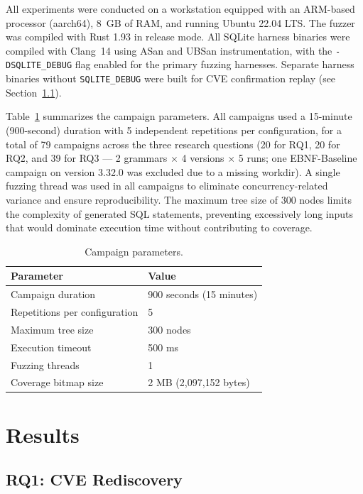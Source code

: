 All experiments were conducted on a workstation equipped with an ARM-based processor (aarch64), 8~GB of RAM, and running Ubuntu 22.04 LTS. The fuzzer was compiled with Rust 1.93 in release mode. All SQLite harness binaries were compiled with Clang~14 using ASan and UBSan instrumentation, with the \texttt{-DSQLITE\_DEBUG} flag enabled for the primary fuzzing harnesses. Separate harness binaries without \texttt{SQLITE\_DEBUG} were built for CVE confirmation replay (see Section~\ref{sec:rq1-results}).



Table~\ref{tab:params} summarizes the campaign parameters. All campaigns used a 15-minute (900-second) duration with 5 independent repetitions per configuration, for a total of 79 campaigns across the three research questions (20 for RQ1, 20 for RQ2, and 39 for RQ3 --- 2 grammars $\times$ 4 versions $\times$ 5 runs; one EBNF-Baseline campaign on version 3.32.0 was excluded due to a missing workdir). A single fuzzing thread was used in all campaigns to eliminate concurrency-related variance and ensure reproducibility. The maximum tree size of 300 nodes limits the complexity of generated SQL statements, preventing excessively long inputs that would dominate execution time without contributing to coverage.

\begin{table}[htbp]
\caption{Campaign parameters.}
\label{tab:params}
\centering
\begin{tabular}{ll}
\toprule
\textbf{Parameter} & \textbf{Value} \\
\midrule
Campaign duration & 900 seconds (15 minutes) \\
Repetitions per configuration & 5 \\
Maximum tree size & 300 nodes \\
Execution timeout & 500 ms \\
Fuzzing threads & 1 \\
Coverage bitmap size & 2 MB (2{,}097{,}152 bytes) \\
\bottomrule
\end{tabular}
\end{table}





\section{Results}
\label{sec:results}

\subsection{RQ1: CVE Rediscovery}
\label{sec:rq1-results}

